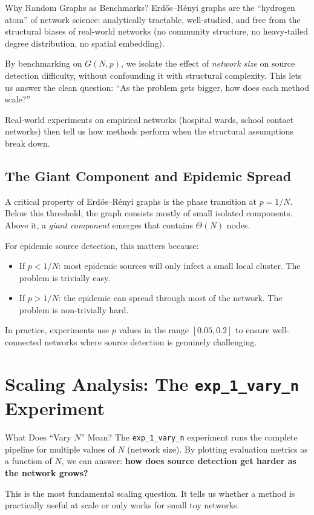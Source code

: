 \begin{analogybox}{Why Random Graphs as Benchmarks?}
Erdős–Rényi graphs are the ``hydrogen atom'' of network science: analytically tractable, well-studied, and free from the structural biases of real-world networks (no community structure, no heavy-tailed degree distribution, no spatial embedding).

By benchmarking on $G(N, p)$, we isolate the effect of \emph{network size} on source detection difficulty, without confounding it with structural complexity. This lets us answer the clean question: ``As the problem gets bigger, how does each method scale?''

Real-world experiments on empirical networks (hospital wards, school contact networks) then tell us how methods perform when the structural assumptions break down.
\end{analogybox}

\subsection{The Giant Component and Epidemic Spread}

A critical property of Erdős–Rényi graphs is the phase transition at $p = 1/N$. Below this threshold, the graph consists mostly of small isolated components. Above it, a \emph{giant component} emerges that contains $\Theta(N)$ nodes.

For epidemic source detection, this matters because:
\begin{itemize}
    \item If $p < 1/N$: most epidemic sources will only infect a small local cluster. The problem is trivially easy.
    \item If $p > 1/N$: the epidemic can spread through most of the network. The problem is non-trivially hard.
\end{itemize}

In practice, experiments use $p$ values in the range $[0.05, 0.2]$ to ensure well-connected networks where source detection is genuinely challenging.

\section{Scaling Analysis: The \texttt{exp\_1\_vary\_n} Experiment}
\label{sec:scaling}

\begin{conceptbox}{What Does ``Vary $N$'' Mean?}
The \texttt{exp\_1\_vary\_n} experiment runs the complete pipeline for multiple values of $N$ (network size). By plotting evaluation metrics as a function of $N$, we can answer: \textbf{how does source detection get harder as the network grows?}

This is the most fundamental scaling question. It tells us whether a method is practically useful at scale or only works for small toy networks.
\end{conceptbox}

